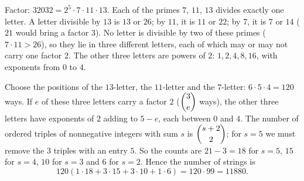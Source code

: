 Factor: $32032=2^5\cdot7\cdot11\cdot13$. Each of the primes $7$, $11$, $13$ divides exactly one letter. A letter divisible by $13$ is $13$ or $26$; by $11$, it is $11$ or $22$; by $7$, it is $7$ or $14$ ($21$ would bring a factor $3$). No letter is divisible by two of these primes ($7\cdot11>26$), so they lie in three different letters, each of which may or may not carry one factor $2$. The other three letters are powers of $2$: $1,2,4,8,16$, with exponents from $0$ to $4$.

Choose the positions of the $13$-letter, the $11$-letter and the $7$-letter: $6\cdot5\cdot4=120$ ways. If $e$ of these three letters carry a factor $2$ ($\dbinom3e$ ways), the other three letters have exponents of $2$ adding to $5-e$, each between $0$ and $4$. The number of ordered triples of nonnegative integers with sum $s$ is $\dbinom{s+2}{2}$; for $s=5$ we must remove the $3$ triples with an entry $5$. So the counts are $21-3=18$ for $s=5$, $15$ for $s=4$, $10$ for $s=3$ and $6$ for $s=2$. Hence the number of strings is
\[
120\left(1\cdot18+3\cdot15+3\cdot10+1\cdot6\right)=120\cdot99=\boxed{11880} .
\]

